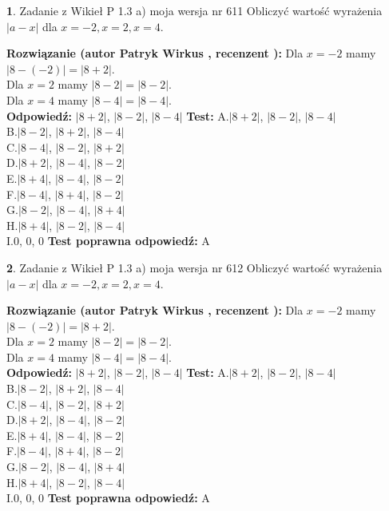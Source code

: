 \documentclass[12pt, a4paper]{article}
\theoremstyle{definition} %
\newtheorem{zad}{}
\newcommand{\zadStart}[1]{\begin{zad}#1\newline}
\newcommand{\zadStop}{\end{zad}}
\newcommand{\rozwStart}[2]{\noindent \textbf{Rozwiązanie (autor #1 , recenzent #2): }\newline}
\newcommand{\rozwStop}{\newline}
\newcommand{\odpStart}{\noindent \textbf{Odpowiedź:}\newline}
\newcommand{\odpStop}{\newline}
\newcommand{\testStart}{\noindent \textbf{Test:}\newline}
\newcommand{\testStop}{\newline}
\newcommand{\kluczStart}{\noindent \textbf{Test poprawna odpowiedź:}\newline}
\newcommand{\kluczStop}{\newline}
\begin{document}
\zadStart{Zadanie z Wikieł P 1.3 a) moja wersja nr 611}
Obliczyć wartość wyrażenia $|a - x|$ dla $x=-2,x=2,x=4$.
\zadStop
\rozwStart{Patryk Wirkus}{}
Dla $x = -2$ mamy $|8 - (-2)| = |8 + 2|$.\\
Dla $x = 2$ mamy $|8 - 2| = |8 - 2|$.\\
Dla $x = 4$ mamy $|8 - 4| = |8 - 4|$.\\
\rozwStop
\odpStart
$|8 + 2|$, $|8 - 2|$, $|8 - 4|$
\odpStop
\testStart
A.$|8 + 2|$, $|8 - 2|$, $|8 - 4|$\\
B.$|8 - 2|$, $|8 + 2|$, $|8 - 4|$\\
C.$|8 - 4|$, $|8 - 2|$, $|8 + 2|$\\
D.$|8 + 2|$, $|8 - 4|$, $|8 - 2|$\\
E.$|8 + 4|$, $|8 - 4|$, $|8 - 2|$\\
F.$|8 - 4|$, $|8 + 4|$, $|8 - 2|$\\
G.$|8 - 2|$, $|8 - 4|$, $|8 + 4|$\\
H.$|8 + 4|$, $|8 - 2|$, $|8 - 4|$\\
I.$0$, $0$, $0$
\testStop
\kluczStart
A
\kluczStop



\zadStart{Zadanie z Wikieł P 1.3 a) moja wersja nr 612}
Obliczyć wartość wyrażenia $|a - x|$ dla $x=-2,x=2,x=4$.
\zadStop
\rozwStart{Patryk Wirkus}{}
Dla $x = -2$ mamy $|8 - (-2)| = |8 + 2|$.\\
Dla $x = 2$ mamy $|8 - 2| = |8 - 2|$.\\
Dla $x = 4$ mamy $|8 - 4| = |8 - 4|$.\\
\rozwStop
\odpStart
$|8 + 2|$, $|8 - 2|$, $|8 - 4|$
\odpStop
\testStart
A.$|8 + 2|$, $|8 - 2|$, $|8 - 4|$\\
B.$|8 - 2|$, $|8 + 2|$, $|8 - 4|$\\
C.$|8 - 4|$, $|8 - 2|$, $|8 + 2|$\\
D.$|8 + 2|$, $|8 - 4|$, $|8 - 2|$\\
E.$|8 + 4|$, $|8 - 4|$, $|8 - 2|$\\
F.$|8 - 4|$, $|8 + 4|$, $|8 - 2|$\\
G.$|8 - 2|$, $|8 - 4|$, $|8 + 4|$\\
H.$|8 + 4|$, $|8 - 2|$, $|8 - 4|$\\
I.$0$, $0$, $0$
\testStop
\kluczStart
A
\kluczStop
\end{document}
